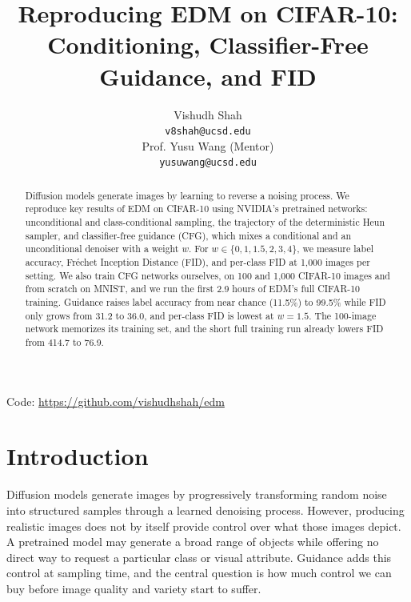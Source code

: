 \documentclass[12pt,letterpaper]{article}
\title{Reproducing EDM on CIFAR-10: Conditioning, Classifier-Free Guidance, and FID}
\author{Vishudh Shah \\
  {\tt v8shah@ucsd.edu} \\\And
  Prof. Yusu Wang (Mentor) \\
  {\tt yusuwang@ucsd.edu} \\}
\begin{document}
\maketitle


\begin{abstract}
    Diffusion models generate images by learning to reverse a noising process.
    We reproduce key results of EDM \citep{karras2022edm} on CIFAR-10 using NVIDIA's pretrained networks: unconditional and class-conditional sampling, the trajectory of the deterministic Heun sampler, and classifier-free guidance (CFG), which mixes a conditional and an unconditional denoiser with a weight \(w\).
    For \(w \in \{0, 1, 1.5, 2, 3, 4\}\), we measure label accuracy, Fr\'echet Inception Distance (FID), and per-class FID at 1,000 images per setting.
    We also train CFG networks ourselves, on 100 and 1,000 CIFAR-10 images and from scratch on MNIST, and we run the first 2.9 hours of EDM's full CIFAR-10 training.
    Guidance raises label accuracy from near chance (11.5\%) to 99.5\% while FID only grows from 31.2 to 36.0, and per-class FID is lowest at \(w = 1.5\).
    The 100-image network memorizes its training set, and the short full training run already lowers FID from 414.7 to 76.9.
\end{abstract}

\begin{center}
Code: \url{https://github.com/vishudhshah/edm}
\end{center}

\maketoc
\clearpage


\section{Introduction}

Diffusion models generate images by progressively transforming random noise into structured samples through a learned denoising process.
However, producing realistic images does not by itself provide control over what those images depict.
A pretrained model may generate a broad range of objects while offering no direct way to request a particular class or visual attribute.
Guidance adds this control at sampling time, and the central question is how much control we can buy before image quality and variety start to suffer.
\end{document}

